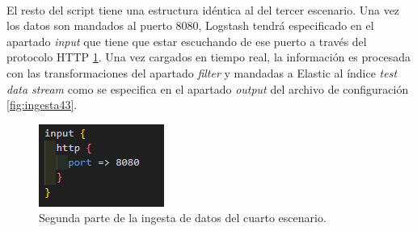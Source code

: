 \paragraph{}
\paragraph{}
\paragraph{}
\paragraph{}
\paragraph{}
\paragraph{}
\paragraph{}
\paragraph{}
\paragraph{}


El resto del script tiene una estructura idéntica al del tercer escenario. Una vez los datos son mandados al puerto 8080, Logstash tendrá especificado en el apartado \textit{input} que tiene que estar escuchando de ese puerto a través del protocolo HTTP \ref{fig:ingesta42}. Una vez cargados en tiempo real, la información es procesada con las transformaciones del apartado \textit{filter} y mandadas a Elastic al índice \textit{test data stream} como se especifica en el apartado \textit{output} del archivo de configuración \ref{fig:ingesta43}.  

\begin{figure}
    \centering
    \includegraphics[width=1\linewidth]{img/ingesta42.png}
    \caption{Segunda parte de la ingesta de datos del cuarto escenario.}
    \label{fig:ingesta42}
\end{figure}

